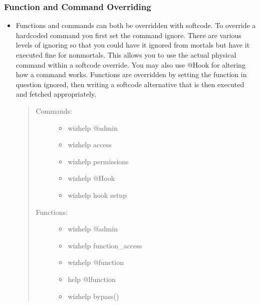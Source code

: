 \documentclass[letterpaper,10pt,english]{sphinxmanual}
\begin{document}
\subsubsection{Function and Command Overriding}
\label{\detokenize{features:function-and-command-overriding}}\begin{itemize}
\item {} 
\sphinxAtStartPar
Functions and commands can both be overridden with softcode.  To
override a hardcoded command you first set the command ignore.
There are various levels of ignoring so that you could have it
ignored from mortals but have it executed fine for non\sphinxhyphen{}mortals.
This allows you to use the actual physical command within a
softcode override.  You may also use @Hook for altering how
a command works.   Functions are overridden by setting the
function in question ignored, then writing a softcode alternative
that is then executed and fetched appropriately.
\begin{quote}
\begin{description}
\item[{Commands:}] \leavevmode\begin{itemize}
\item {} 
\sphinxAtStartPar
wizhelp @admin

\item {} 
\sphinxAtStartPar
wizhelp access

\item {} 
\sphinxAtStartPar
wizhelp permissions

\item {} 
\sphinxAtStartPar
wizhelp @Hook

\item {} 
\sphinxAtStartPar
wizhelp hook setup

\end{itemize}

\item[{Functions:}] \leavevmode\begin{itemize}
\item {} 
\sphinxAtStartPar
wizhelp @admin

\item {} 
\sphinxAtStartPar
wizhelp function\_access

\item {} 
\sphinxAtStartPar
wizhelp @function

\item {} 
\sphinxAtStartPar
help @lfunction

\item {} 
\sphinxAtStartPar
wizhelp bypass()

\end{itemize}

\end{description}
\end{quote}

\end{itemize}
\end{document}
